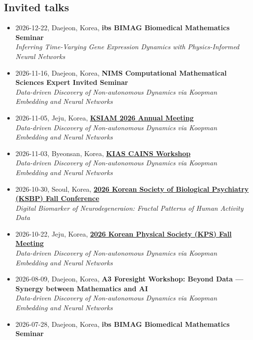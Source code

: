 \documentclass[margin,line]{res}
\begin{document}
\begin{resume}
\section{\sc Invited talks}
\begin{itemize}[leftmargin=0pt, label={}]
    \item 2026-12-22, Daejeon, Korea, \textbf{ibs BIMAG Biomedical Mathematics Seminar} \\
    \textit{Inferring Time-Varying Gene Expression Dynamics with Physics-Informed Neural Networks}
    \item 2026-11-16, Daejeon, Korea, \textbf{NIMS Computational Mathematical Sciences Expert Invited Seminar} \\
    \textit{Data-driven Discovery of Non-autonomous Dynamics via Koopman Embedding and Neural Networks}
    \item 2026-11-05, Jeju, Korea, \href{https://ksiam.org/Conference/ConferenceView.asp?AC=0&CODE=CC20260801&CpPage=277#CONF}{\textbf{KSIAM 2026 Annual Meeting}} \\
    \textit{Data-driven Discovery of Non-autonomous Dynamics via Koopman Embedding and Neural Networks}
    \item 2026-11-03, Byeonsan, Korea, \href{https://symposia.kias.re.kr/cains-nov2026}{\textbf{KIAS CAINS Workshop}} \\
    \textit{Data-driven Discovery of Non-autonomous Dynamics via Koopman Embedding and Neural Networks}
    \item 2026-10-30, Seoul, Korea, \href{https://www.biolpsychiatry.or.kr/html/?pmode=inputList&smode=view&part=&intAcSeq=234}{\textbf{2026 Korean Society of Biological Psychiatry (KSBP) Fall Conference}} \\
    \textit{Digital Biomarker of Neurodegeneraion: Fractal Patterns of Human Activity Data}
    \item 2026-10-22, Jeju, Korea, \href{https://www.kps.or.kr/conference/event/index.php}{\textbf{2026 Korean Physical Society (KPS) Fall Meeting}} \\
    \textit{Data-driven Discovery of Non-autonomous Dynamics via Koopman Embedding and Neural Networks}
    \item 2026-08-09, Daejeon, Korea, \textbf{A3 Foresight Workshop: Beyond Data — Synergy between Mathematics and AI} \\
    \textit{Data-driven Discovery of Non-autonomous Dynamics via Koopman Embedding and Neural Networks}
    \item 2026-07-28, Daejeon, Korea, \textbf{ibs BIMAG Biomedical Mathematics Seminar} \\

\end{itemize}
\end{resume}
\end{document}
